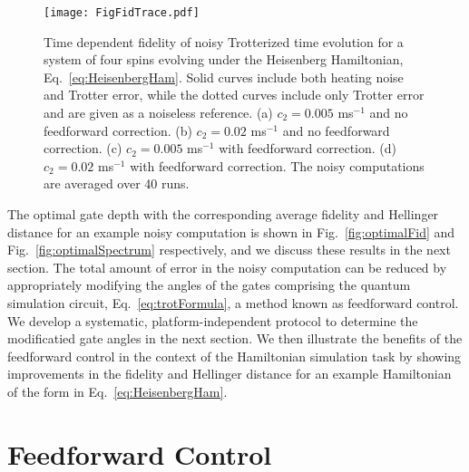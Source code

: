 \documentclass[prx,aps,twocolumn,showpacs,superscriptaddress,10pt]{revtex4-1}
\begin{document}
\begin{figure*}[t!]
	\centering
	\texttt{[image: FigFidTrace.pdf]}
	\caption{Time dependent fidelity of noisy Trotterized time evolution for a system of four spins evolving under the Heisenberg Hamiltonian, Eq.~\eqref{eq:HeisenbergHam}. Solid curves include both heating noise and Trotter error, while the dotted curves include only Trotter error and are given as a noiseless reference. (a) $c_{2}=0.005$ ms$^{-1}$ and no feedforward correction. (b) $c_{2}=0.02$ ms$^{-1}$ and no feedforward correction. (c) $c_{2}=0.005$ ms$^{-1}$ with feedforward correction. (d) $c_{2}=0.02$ ms$^{-1}$ with feedforward correction. The noisy computations are averaged over 40 runs.}
	\label{fig:fidTimeTrace}
\end{figure*}

The optimal gate depth with the corresponding average fidelity and Hellinger distance for an example noisy computation is shown in Fig.~\ref{fig:optimalFid} and Fig.~\ref{fig:optimalSpectrum} respectively, and we discuss these results in the next section. The total amount of error in the noisy computation can be reduced by appropriately modifying the angles of the gates comprising the quantum simulation circuit, Eq.~\eqref{eq:trotFormula}, a method known as feedforward control. We develop a systematic, platform-independent protocol to determine the modificatied gate angles in the next section. We then illustrate the benefits of the feedforward control in the context of the Hamiltonian simulation task by showing improvements in the fidelity and Hellinger distance for an example Hamiltonian of the form in Eq.~\eqref{eq:HeisenbergHam}.

\section{Feedforward Control}
\label{sec:controlFramework}
\end{document}
